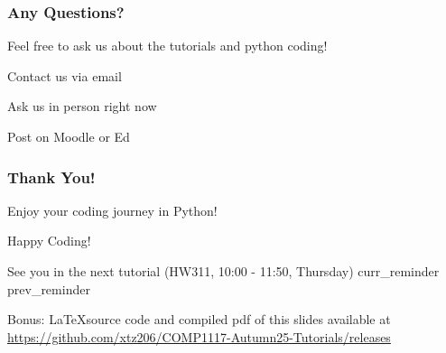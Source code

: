 \begin{{frame}}
    \frametitle{{Any Questions?}}

    Feel free to ask us about the tutorials and python coding!

    \begin{{itemize}}
        \item Contact us via email
        \item Ask us in person right now
        \item Post on Moodle or Ed
    \end{{itemize}}
\end{{frame}}

\begin{{frame}}
    \frametitle{{Thank You!}}

    Enjoy your coding journey in Python!

    \begin{{itemize}}
        \item Happy Coding!
        \item See you in the next tutorial (HW311, 10:00 - 11:50, Thursday)
        {curr_reminder}
        {prev_reminder}
        \item Bonus: \LaTeX source code and compiled pdf of this slides available at
              \href{{https://github.com/xtz206/COMP1117-Autumn25-Tutorials/releases}}
              {{https://github.com/xtz206/COMP1117-Autumn25-Tutorials/releases}}
    \end{{itemize}}
\end{{frame}}